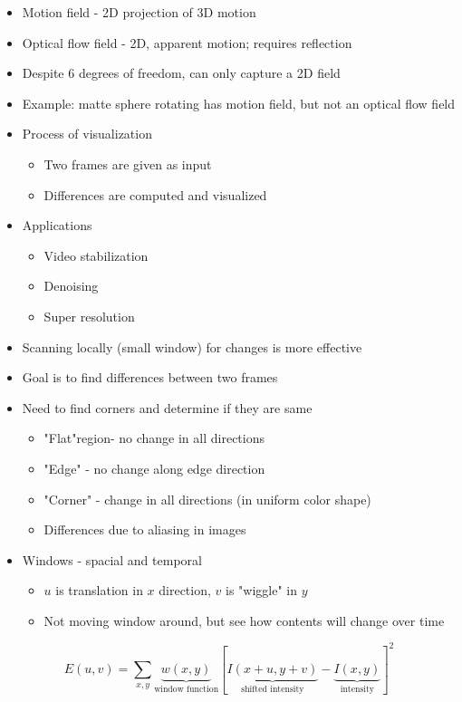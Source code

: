 \documentclass{article}
\begin{document}
\begin{itemize}
\item Motion field - 2D projection of 3D motion
\item Optical flow field - 2D, apparent motion; requires reflection
\item Despite 6 degrees of freedom, can  only capture a 2D field
\item Example: matte sphere rotating has motion field, but not an optical flow field
\item Process of visualization
\begin{itemize}
\item Two frames are given as input
\item Differences are computed and visualized
\end{itemize}
\item Applications
\begin{itemize}
\item Video stabilization
\item Denoising
\item Super resolution
\end{itemize}
\item Scanning locally (small window) for changes is more effective
\item Goal is to find differences between  two frames
\item Need to find corners and determine if they are same
\begin{itemize}
\item "Flat"region- no change in all directions
\item "Edge" - no change along edge direction
\item "Corner" - change in all directions (in uniform color shape)
\item Differences due to aliasing in images
\end{itemize}
\item Windows - spacial and temporal
\begin{itemize}
\item $u$ is translation in $x$ direction, $v$ is "wiggle" in $y$ 
\item Not moving window around, but see how contents will change over time
\end{itemize}
\end{itemize}
\begin{equation*}
E(u,v)=\sum_{x,y}\underbrace{w(x,y)}_\text{window function}[\underbrace{I(x+u,y+v)}_\text{shifted intensity}-\underbrace{I(x,y)}_\text{intensity}]^2
\end{equation*}
\end{document}
